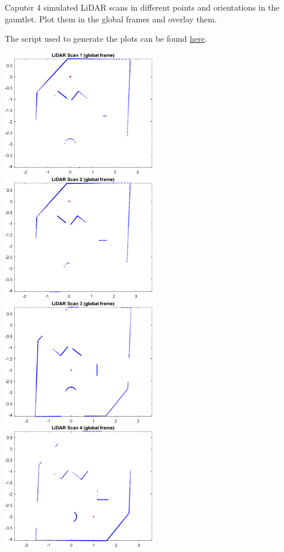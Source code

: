 Caputer 4 simulated LiDAR scans in different points and orientations in the gauntlet. Plot them in the global frames and overlay them.

\begin{solution}
    The script used to generate the plots can be found \href{https://gist.github.com/wsh32/a34eabb7091e2bcc5b37040a48d41f49}{here}.
    
    \begin{center}
        \includegraphics[width=0.5\textwidth]{img/e41.png}
        \includegraphics[width=0.5\textwidth]{img/e42.png}
        \includegraphics[width=0.5\textwidth]{img/e43.png}
        \includegraphics[width=0.5\textwidth]{img/e44.png}

\end{center}
\end{solution}
